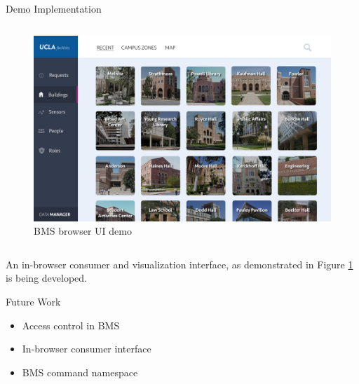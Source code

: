 \documentclass[final,hyperref={pdfpagelabels=false},20pt]{beamer}
\begin{document}
\begin{frame}[t]
\begin{columns}[t]
\begin{column}{.465\textwidth}
\begin{block}{Demo Implementation}
\begin{columns}[T]
\begin{column}{.51\textwidth}
\begin{figure}
\includegraphics[width=\linewidth]{bms-ui-demo.png}
\caption{BMS browser UI demo}
\label{fig:bms-ui}
\end{figure}
\end{column}

\end{columns}

\vspace{10mm}

An in-browser consumer and visualization interface, as demonstrated in Figure \ref{fig:bms-ui} is being developed.

\vspace{10mm}

\end{block}


\begin{block}{Future Work}
\begin{itemize}
\item Access control in BMS
\item In-browser consumer interface
\item BMS command namespace
\end{itemize}
\end{block}



\end{column}
\end{columns}
\end{frame}
\end{document}
